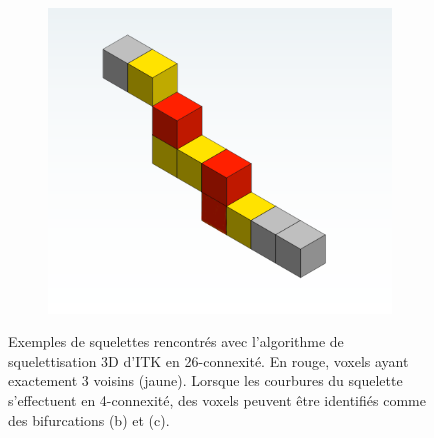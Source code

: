 \begin{figure}[!ht]
\begin{subfigure}{0.32\textwidth}
    \caption{}
  \end{subfigure}
  \begin{subfigure}{0.32\textwidth}
    \centering
    \includegraphics[width=\textwidth]{Images/problem_skel2.png}
    \caption{}
  \end{subfigure}
  \caption{Exemples de squelettes rencontrés avec l'algorithme de squelettisation 3D d'ITK en 26-connexité. En rouge, voxels ayant exactement 3 voisins (jaune). Lorsque les courbures du squelette s'effectuent en 4-connexité, des voxels peuvent être identifiés comme des bifurcations (b) et (c).}
  \label{fig:skel_illustration}
\end{figure}

